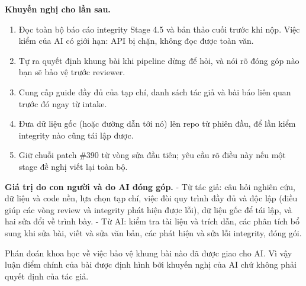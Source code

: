 \documentclass[12pt,a4paper]{article}
\providecommand{\tightlist}{\setlength{\itemsep}{0pt}\setlength{\parskip}{0pt}}
\begin{document}
\textbf{Khuyến nghị cho lần sau.}

\begin{enumerate}
\def\labelenumi{\arabic{enumi}.}
\tightlist
\item
  Đọc toàn bộ báo cáo integrity Stage 4.5 và bản thảo cuối trước khi
  nộp. Việc kiểm của AI có giới hạn: API bị chặn, không đọc được toàn
  văn.
\item
  Tự ra quyết định khung bài khi pipeline dừng để hỏi, và nói rõ đóng
  góp nào bạn sẽ bảo vệ trước reviewer.
\item
  Cung cấp guide đầy đủ của tạp chí, danh sách tác giả và bài báo liên
  quan trước đó ngay từ intake.
\item
  Đưa dữ liệu gốc (hoặc đường dẫn tới nó) lên repo từ phiên đầu, để lần
  kiểm integrity nào cũng tái lập được.
\item
  Giữ chuỗi patch \#390 từ vòng sửa đầu tiên; yêu cầu rõ điều này nếu
  một stage đề nghị viết lại toàn bộ.
\end{enumerate}

\textbf{Giá trị do con người và do AI đóng góp.} - Từ tác giả: câu hỏi
nghiên cứu, dữ liệu và code nền, lựa chọn tạp chí, việc đòi quy trình
đầy đủ và độc lập (điều giúp các vòng review và integrity phát hiện được
lỗi), dữ liệu gốc để tái lập, và hai sửa đổi về trình bày. - Từ AI: kiểm
tra tài liệu và trích dẫn, các phân tích bổ sung khi sửa bài, viết và
sửa văn bản, các phát hiện và sửa lỗi integrity, đóng gói.

Phán đoán khoa học về việc bảo vệ khung bài nào đã được giao cho AI. Vì
vậy luận điểm chính của bài được định hình bởi khuyến nghị của AI chứ
không phải quyết định của tác giả.
\end{document}
